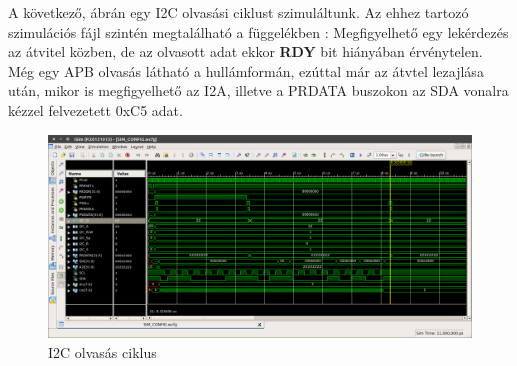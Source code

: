 A következő,  ábrán egy I2C olvasási ciklust szimuláltunk. Az ehhez tartozó szimulációs fájl szintén megtalálható a függelékben :
Megfigyelhető egy lekérdezés az átvitel közben, de az olvasott adat ekkor \textbf{RDY} bit hiányában érvénytelen. Még egy APB olvasás látható a hullámformán, ezúttal már az átvtel lezajlása után, mikor is megfigyelhető az I2A, illetve a PRDATA buszokon az SDA vonalra kézzel felvezetett 0xC5 adat. 
\begin{figure}[ht!]
    \includegraphics[width=\textwidth]{figures/I2C_R4.png}
    \caption{I2C olvasás ciklus}
    \label{fig:I2Cread}
\end{figure}
